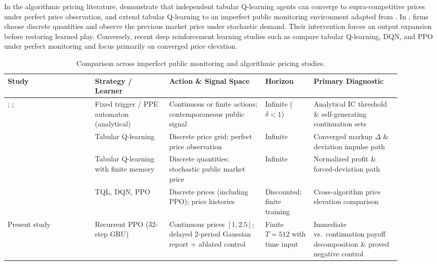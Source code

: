\documentclass{article}
\begin{document}
In the algorithmic pricing literature, \citet{calvano2020artificial} demonstrate that independent tabular Q-learning agents can converge to supra-competitive prices under perfect price observation, and \citet{calvano2021algorithmic} extend tabular Q-learning to an imperfect public monitoring environment adapted from \citet{green1984noncooperative}. In \citet{calvano2021algorithmic}, firms choose discrete quantities and observe the previous market price under stochastic demand. Their intervention forces an output expansion before restoring learned play. Conversely, recent deep reinforcement learning studies such as \citet{deng2025exploring} compare tabular Q-learning, DQN, and PPO under perfect monitoring and focus primarily on converged price elevation.

\begin{table}[t]
\centering
\caption{Comparison across imperfect public monitoring and algorithmic pricing studies.}
\label{tab:lit_comparison}
\footnotesize
\begingroup
\setlength{\tabcolsep}{3pt}
\begin{tabular}{@{}p{0.20\linewidth}p{0.17\linewidth}p{0.22\linewidth}p{0.11\linewidth}p{0.20\linewidth}@{}}
\toprule
Study & Strategy / Learner & Action \& Signal Space & Horizon & Primary Diagnostic \\
\midrule
\citet{green1984noncooperative}; \citet{abreu1990toward}; \citet{fudenberg1994folk}
  & Fixed trigger / PPE automaton (analytical)
  & Continuous or finite actions; contemporaneous public signal
  & Infinite ($\delta < 1$)
  & Analytical IC threshold \& self-generating continuation sets \\
\addlinespace[3pt]
\citet{calvano2020artificial}
  & Tabular Q-learning
  & Discrete price grid; perfect price observation
  & Infinite
  & Converged markup $\Delta$ \& deviation impulse path \\
\addlinespace[3pt]
\citet{calvano2021algorithmic}
  & Tabular Q-learning with finite memory
  & Discrete quantities; stochastic public market price
  & Infinite
  & Normalized profit \& forced-deviation path \\
\addlinespace[3pt]
\citet{deng2025exploring}
  & TQL, DQN, PPO
  & Discrete prices (including PPO); price histories
  & Discounted; finite training
  & Cross-algorithm price elevation comparison \\
\addlinespace[3pt]
Present study
  & Recurrent PPO (32-step GRU)
  & Continuous prices $[1,2.5]$; delayed 2-period Gaussian report + ablated control
  & Finite $T=512$ with time input
  & Immediate vs.\ continuation payoff decomposition \& proved negative control \\
\bottomrule
\end{tabular}
\endgroup
\end{table}
\end{document}
